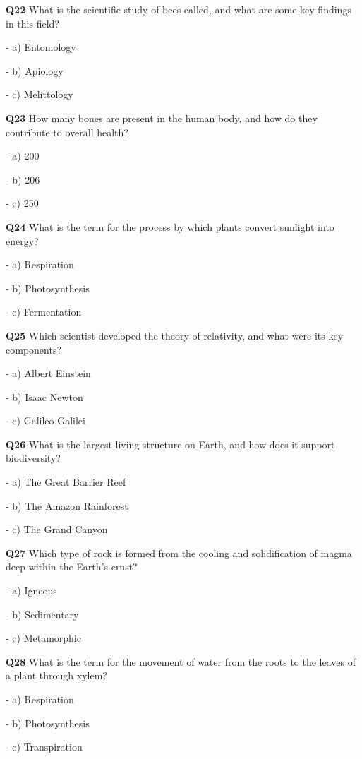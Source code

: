 \textbf{Q22} What is the scientific study of bees called, and what are some key findings in this field?\par
\quad - a) Entomology\par
\quad - b) Apiology\par
\quad - c) Melittology\par

\textbf{Q23} How many bones are present in the human body, and how do they contribute to overall health?\par
\quad - a) 200\par
\quad - b) 206\par
\quad - c) 250\par

\textbf{Q24} What is the term for the process by which plants convert sunlight into energy?\par
\quad - a) Respiration\par
\quad - b) Photosynthesis\par
\quad - c) Fermentation\par

\textbf{Q25} Which scientist developed the theory of relativity, and what were its key components?\par
\quad - a) Albert Einstein\par
\quad - b) Isaac Newton\par
\quad - c) Galileo Galilei\par

\textbf{Q26} What is the largest living structure on Earth, and how does it support biodiversity?\par
\quad - a) The Great Barrier Reef\par
\quad - b) The Amazon Rainforest\par
\quad - c) The Grand Canyon\par

\textbf{Q27} Which type of rock is formed from the cooling and solidification of magma deep within the Earth's crust?\par
\quad - a) Igneous\par
\quad - b) Sedimentary\par
\quad - c) Metamorphic\par

\textbf{Q28} What is the term for the movement of water from the roots to the leaves of a plant through xylem?\par
\quad - a) Respiration\par
\quad - b) Photosynthesis\par
\quad - c) Transpiration\par

